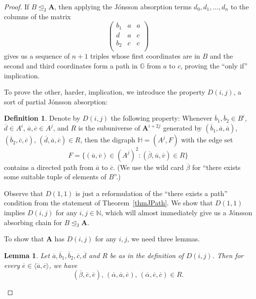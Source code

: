 \documentclass{amsart}
\theoremstyle{plain}
\newtheorem{lemma}[theorem]{Lemma}
\theoremstyle{definition}
\newtheorem{definition}[theorem]{Definition}
\begin{document}
\begin{proof}
If $B\operatorname{\trianglelefteq_J}{{\mathbf{A}}}$, then applying the J\'onsson absorption terms
$d_0,d_1,\dots,d_n$ to the columns of the matrix
\[
  \begin{pmatrix}
    b_1&a& a\\
    d & a&c\\
    b_2 &c&c\\
  \end{pmatrix}
\]
gives us a sequence of $n+1$ triples whose first coordinates are in $B$ and
the second and third coordinates form a path in ${\mathbb{{G}}}$ from $a$ to $c$,
proving the ``only if'' implication.

To prove the other, harder, implication, we introduce the property $D(i,j)$, a sort of partial
J\'onsson absorption:
\begin{definition}\label{defDij}
  Denote by $D(i,j)$ the
following property: Whenever 
${\overline{b}}_1,{\overline{b}}_2 \in B^i$, ${\overline{d}}\in A^i$, ${\overline{a}},{\overline{c}}\in A^j$, and 
$R$ is the subuniverse of ${{\mathbf{A}}}^{i+2j}$ generated by  $({\overline{b}}_1,{\overline{a}},{\overline{a}})$, $({\overline{b}}_2,{\overline{c}},{\overline{c}})$,
$({\overline{d}},{\overline{a}},{\overline{c}})\in R$, then the digraph ${\mathbb{{H}}}=(A^j,F)$ with the edge set
\[
  F=\{({\overline{u}},{\overline{v}})\in (A^j)^2\colon ({\overline{\beta}},{\overline{u}},{\overline{v}})\in R\}
\]
contains a directed path from ${\overline{a}}$ to ${\overline{c}}$. (We use the wild card
${\overline{\beta}}$ for ``there exists some suitable tuple of elements of $B$''.)
\end{definition}

Observe that $D(1,1)$ is just a reformulation of the ``there exists a path'' condition from the
statement of Theorem~\ref{thmJPath}. We show that $D(1,1)$ implies $D(i,j)$ for
any $i,j\in {{\mathbb N}}$, which will almost immediately give us a J\'onsson
absorbing chain for $B \operatorname{\trianglelefteq_J} {{\mathbf{A}}}$.

To show that ${{\mathbf{A}}}$ has $D(i,j)$ for any $i,j$, we need three lemmas.
\begin{lemma}\label{lemEdges} 
  Let ${\overline{a}}, {\overline{b}}_1,{\overline{b}}_2, {\overline{c}}, {\overline{d}}$ and $R$ be 
  as in the definition of $D(i,j)$. 
  Then for every ${\overline{e}}\in \langle {\overline{a}},{\overline{c}}\rangle$, we have
  \[
    ({\overline{\beta}},{\overline{e}},{\overline{e}}),\, ({\overline{\alpha}},{\overline{a}}, {\overline{e}}),\,({\overline{\alpha}},{\overline{e}},{\overline{c}})\in R.
  \]
\end{lemma} 


\end{proof}
\end{document}
